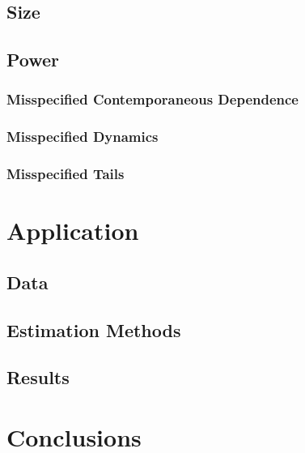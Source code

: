 \documentclass[12pt]{article}
\begin{document}
\subsection{Size}
\subsection{Power}
\subsubsection{Misspecified Contemporaneous Dependence}
\subsubsection{Misspecified Dynamics}
\subsubsection{Misspecified Tails}
\section{Application}
\subsection{Data}
\subsection{Estimation Methods}
\subsection{Results}
\section{Conclusions}



\end{document}
